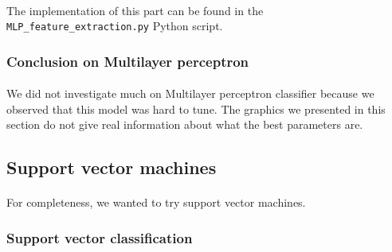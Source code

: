 \documentclass[a4paper, 11pt, oneside]{article}
\begin{document}
\paragraph{}The implementation of this part can be found in the \texttt{MLP\_feature\_extraction.py} Python script.

\subsubsection{Conclusion on Multilayer perceptron}

\paragraph{}We did not investigate much on Multilayer perceptron classifier because we observed that this model was hard to tune. The graphics we presented in this section do not give real information about what the best parameters are.


\subsection{Support vector machines}
\paragraph{}For completeness, we wanted to try support vector machines.

\subsubsection{Support vector classification} \label{subsubsec:svc}
\end{document}
